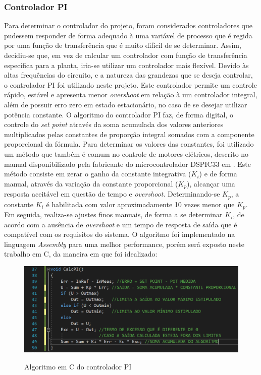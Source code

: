 \subsubsection{Controlador PI}
Para determinar o controlador do projeto, foram considerados controladores que pudessem responder de forma adequado à uma variável de processo que é regida por uma função de transferência que é muito difícil de se determinar. Assim, decidiu-se que, em vez de calcular um controlador com função de transferência específica para a planta, iria-se utilizar um controlador mais flexível. Devido às altas frequências do circuito, e a natureza das grandezas que se deseja controlar, o controlador PI foi utilizado neste projeto. Este controlador permite um controle rápido, estável e apresenta menor \textit{overshoot} em relação à um controlador integral, além de possuir erro zero em estado estacionário, no caso de se desejar utilizar potência constante. O algoritmo do controlador PI faz, de forma digital, o controle do \textit{set point} através da soma acumulada dos valores anteriores multiplicados pelas constantes de proporção integral somados com a componente proporcional da fórmula. Para determinar os valores das constantes, foi utilizado um método que também é comum no controle de motores elétricos, descrito no manual disponibilizado pela fabricante do microcontrolador DSPIC33 em . Este método consiste em zerar o ganho da constante integrativa ($K_i$) e de forma manual, através da variação da constante proporcional ($K_p$), alcançar uma resposta aceitável em questão de tempo e \textit{overshoot}. Determinando-se $K_p$, a constante $K_i$ é habilitada com valor aproximadamente 10 vezes menor que $K_p$. Em seguida, realiza-se ajustes finos manuais, de forma a se determinar $K_i$, de acordo com a ausência de \textit{overshoot} e um tempo de resposta de saída que é compatível com os requisitos do sistema. O algoritmo foi implementado na linguagem \textit{Assembly} para uma melhor performance, porém será exposto neste trabalho em C, da maneira em que foi idealizado:

\begin{figure}[H]
    \centering
    \caption{Algoritmo em C do controlador PI}
    \includegraphics[width=1\textwidth]{./dados/figuras/func_pi}
    \label{fig:figura-func-pi}
\end{figure}

